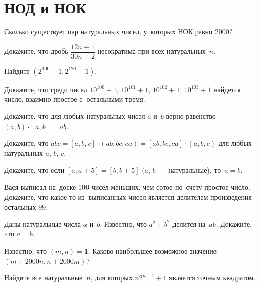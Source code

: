 
\section*{НОД и НОК}


\begin{problems}

\item
Сколько существует пар натуральных чисел, у~которых НОК равно $2000$?

\item
Докажите, что дробь\enspace
$\dfrac{12 n + 1}{30 n + 2}$\enspace
несократима при всех натуральных~$n$.

\item
Найдите $(2^{100} - 1, 2^{120} - 1)$.

\item
Докажите, что среди чисел
$10^{100} + 1$, $10^{101} + 1$, $10^{102} + 1$, $10^{103} + 1$ найдется число,
взаимно простое с~остальными тремя.

\item
Докажите, что для любых натуральных чисел $a$ и~$b$ верно равенство
$(a, b) \cdot [a, b] = a b$.

\item
Докажите, что
\(
    a b c
=
    [a, b, c] \cdot (a b, b c, c a)
=
    [a b, b c, c a] \cdot (a, b, c)
\)
для любых натуральных $a$, $b$, $c$.

\item
Докажите, что если $[a, a + 5] = [b, b + 5]$ ($a$, $b$~--- натуральные),
то~$a = b$.

\item
Вася выписал на~доске $100$ чисел меньших, чем сотое по~счету простое число.
Докажите, что какое-то из~выписанных чисел является делителем произведения
остальных $99$.

\item
Даны натуральные числа $a$ и~$b$.
Известно, что $a^2 + b^2$ делится на~$ab$.
Докажите, что $a = b$.

\item
Известно, что $(m, n) = 1$.
Каково наибольшее возможное значение $(m + 2000 n, n + 2000 m)$?

\item
Найдите все натуральные~$n$, для которых $n 2^{n-1} + 1$ является точным
квадратом.

\end{problems}

